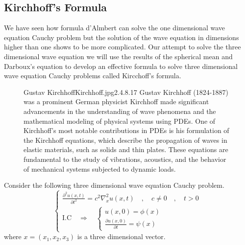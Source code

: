 \subsection{Kirchhoff's Formula}
We have seen how formula d'Almbert can solve the one dimensional wave equation Cauchy problem but the solution of the wave equation in dimensions higher than one shows to be more complicated. 
Our attempt to solve the three dimensional wave equation 
we will use the results of the spherical mean and Darboux's equation to develop an effective formula to solve three dimensional wave equation Cauchy problems called Kircchoff's formula.
\par
\begin{figure}[b]
    \begin{minipage}[h]{\textwidth}
    \begin{enrichment}{Gustav Kirchhoff}{Kirchhoff.jpg}{2.4}{.8}{.17}
        Gustav Kirchhoff (1824-1887) was a prominent German physicist
        Kirchhoff made significant advancements in the understanding of wave phenomena and the mathematical modeling of physical systems using PDEs.
        One of Kirchhoff's most notable contributions in PDEs is his formulation of the Kirchhoff equations, which describe the propagation of waves in elastic materials, such as solids and thin plates. These equations are fundamental to the study of vibrations, acoustics, and the behavior of mechanical systems subjected to dynamic loads.
    \end{enrichment}    
\end{minipage}
\end{figure}
Consider the following three dimensional wave equation Cauchy problem.
\begin{equation}
    \begin{cases}
        \displaystyle \frac{\partial^2 u(x,t)}{\partial t^2} = c^2 \nabla_{x}^{2}u(x,t) \quad,\quad c\neq 0 \quad,\quad t > 0
        \\
        \text{I.C} \quad \Longrightarrow \quad 
        \begin{cases}
            u\left(x,0 \right) = \phi\left(x\right)
            \\
            \displaystyle \frac{\partial u\left(x,0 \right)}{\partial t} = \psi\left(x\right)
        \end{cases} 
    \end{cases}
\end{equation}
where $x = (x_1,x_2,x_3)$ is a three dimensional vector.
\par
